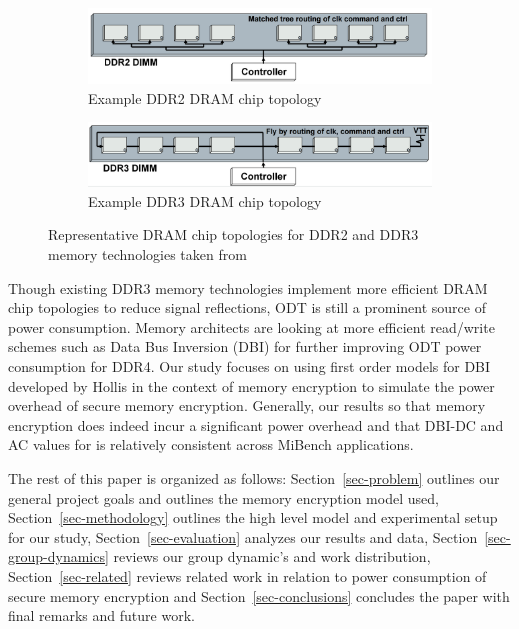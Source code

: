 \begin{figure}[!htb]
  \centering
  \begin{subfigure}[b]{0.4\textwidth}
    \includegraphics[width=\textwidth]{figs/ddr2-topology}
    \caption{Example DDR2 DRAM chip topology}
    \label{fig:ddr2-chips}
  \end{subfigure}

  \begin{subfigure}[b]{0.4\textwidth}
    \includegraphics[width=\textwidth]{figs/ddr3-topology}
    \caption{Example DDR3 DRAM chip topology}
    \label{fig:ddr3-chips}
  \end{subfigure}
  \caption{Representative DRAM chip topologies for DDR2 and DDR3 memory
  technologies taken from \cite{ddr-design}}
  \label{dram-chips}
\end{figure}

Though existing DDR3 memory technologies implement more efficient DRAM chip
topologies to reduce signal reflections, ODT is still a prominent source of
power consumption. Memory architects are looking at more efficient read/write
schemes such as Data Bus Inversion (DBI) for further improving ODT power
consumption for DDR4. Our study focuses on using first order models for DBI
developed by Hollis \cite{hollis} in the context of memory encryption to
simulate the power overhead of secure memory encryption. Generally, our results
so that memory encryption does indeed incur a significant power overhead and
that DBI-DC and AC values for is relatively consistent across MiBench
applications.

The rest of this paper is organized as follows: Section~\ref{sec-problem}
outlines our general project goals and outlines the memory encryption model
used, Section~\ref{sec-methodology} outlines the high level model and
experimental setup for our study, Section~\ref{sec-evaluation} analyzes our
results and data, Section~\ref{sec-group-dynamics} reviews our group dynamic's
and work distribution, Section~\ref{sec-related} reviews related work in
relation to power consumption of secure memory encryption and
Section~\ref{sec-conclusions} concludes the paper with final remarks and future
work.
